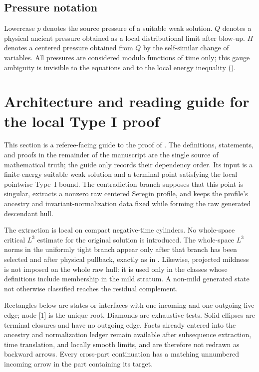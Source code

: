 \documentclass[11pt]{amsart}
\theoremstyle{plain}
\theoremstyle{definition}
\theoremstyle{remark}
\numberwithin{equation}{section}
\begin{document}
\subsection*{Pressure notation}

Lowercase \(p\) denotes the source pressure of a suitable weak solution.
\(Q\) denotes a physical ancient pressure obtained as a local distributional
limit after blow-up.  \(\Pi\) denotes a centered pressure obtained from
\(Q\) by the self-similar change of variables.  All pressures are
considered modulo functions of time only; this gauge ambiguity is invisible
to the equations and to the local energy inequality
().

\section{Architecture and reading guide for the local Type I proof}
\label{sec:local-typeI-proof-architecture}

This section is a referee-facing guide to the proof of
.  The definitions, statements, and proofs in the
remainder of the manuscript are the single source of mathematical truth; the
guide only records their dependency order.  Its input is a finite-energy
suitable weak solution and a terminal point satisfying the local pointwise
Type~I bound.  The contradiction branch supposes that this point is singular,
extracts a nonzero raw centered Seregin profile, and keeps the profile's
ancestry and invariant-normalization data fixed while forming the raw generated
descendant hull.

The extraction is local on compact negative-time cylinders.  No whole-space
critical \(L^3\) estimate for the original solution is introduced.  The
whole-space \(L^3\) norms in the uniformly tight branch appear only after that
branch has been selected and after physical pullback, exactly as in
.  Likewise, projected mildness is not imposed on
the whole raw hull: it is used only in the classes whose definitions include
membership in the mild stratum.  A non-mild generated state not otherwise
classified reaches the residual complement.

Rectangles below are states or interfaces with one incoming and one outgoing
live edge; node [1] is the unique root.  Diamonds are exhaustive tests.  Solid
ellipses are terminal closures and have no outgoing edge.  Facts already
entered into the ancestry and normalization ledger remain available after
subsequence extraction, time translation, and locally smooth limits, and are
therefore not redrawn as backward arrows.  Every cross-part continuation has a
matching unnumbered incoming arrow in the part containing its target.
\end{document}
